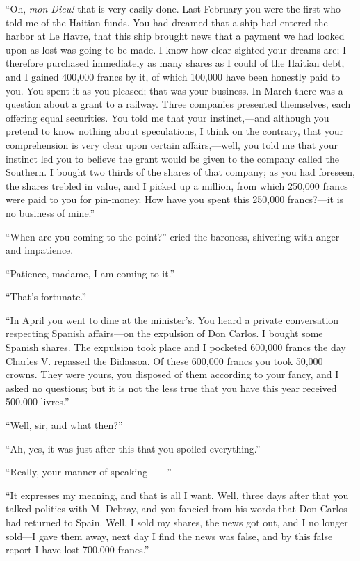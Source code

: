 “Oh, \textit{mon Dieu!} that is very easily done. Last February you were the
first who told me of the Haitian funds. You had dreamed that a ship had
entered the harbor at Le Havre, that this ship brought news that a
payment we had looked upon as lost was going to be made. I know how
clear-sighted your dreams are; I therefore purchased immediately as
many shares as I could of the Haitian debt, and I gained 400,000 francs
by it, of which 100,000 have been honestly paid to you. You spent it as
you pleased; that was your business. In March there was a question
about a grant to a railway. Three companies presented themselves, each
offering equal securities. You told me that your instinct,—and although
you pretend to know nothing about speculations, I think on the
contrary, that your comprehension is very clear upon certain
affairs,—well, you told me that your instinct led you to believe the
grant would be given to the company called the Southern. I bought two
thirds of the shares of that company; as you had foreseen, the shares
trebled in value, and I picked up a million, from which 250,000 francs
were paid to you for pin-money. How have you spent this 250,000
francs?—it is no business of mine.”

“When are you coming to the point?” cried the baroness, shivering with
anger and impatience.

“Patience, madame, I am coming to it.”

“That’s fortunate.”

“In April you went to dine at the minister’s. You heard a private
conversation respecting Spanish affairs—on the expulsion of Don Carlos.
I bought some Spanish shares. The expulsion took place and I pocketed
600,000 francs the day Charles V. repassed the Bidassoa. Of these
600,000 francs you took 50,000 crowns. They were yours, you disposed of
them according to your fancy, and I asked no questions; but it is not
the less true that you have this year received 500,000 livres.”

“Well, sir, and what then?”

“Ah, yes, it was just after this that you spoiled everything.”

“Really, your manner of speaking——”

“It expresses my meaning, and that is all I want. Well, three days
after that you talked politics with M. Debray, and you fancied from his
words that Don Carlos had returned to Spain. Well, I sold my shares,
the news got out, and I no longer sold—I gave them away, next day I
find the news was false, and by this false report I have lost 700,000
francs.”

